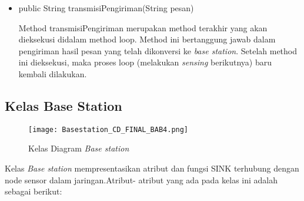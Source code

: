 \begin{itemize}
        \item public String transmisiPengiriman(String pesan)
        
        Method transmisiPengiriman merupakan method terakhir yang akan dieksekusi didalam method loop. Method ini bertanggung jawab dalam pengiriman hasil pesan yang telah dikonversi ke \textit{base station}. Setelah method ini dieksekusi, maka proses loop (melakukan \textit{sensing} berikutnya) baru kembali dilakukan.
        
        
        
    \end{itemize}

\subsection{Kelas Base Station}

    \begin{figure}[H]
    	\centering  
    	\texttt{[image: Basestation\_CD\_FINAL\_BAB4.png]}
    	\caption[Kelas Diagram \textit{Base station}]{Kelas Diagram \textit{Base station}} 
    	\label{fig:Kelas Diagram Base Station} 
    \end{figure}
    
     Kelas \textit{Base station} mempresentasikan atribut dan fungsi SINK terhubung dengan node sensor dalam jaringan.Atribut- atribut yang ada pada kelas ini adalah sebagai berikut:

